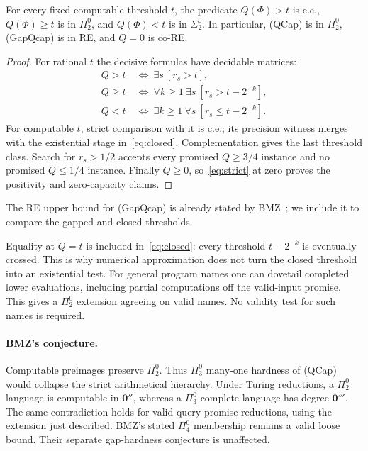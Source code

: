 \begin{corollary}\label{cor:threshold}
For every fixed computable threshold $t$, the predicate $Q(\Phi)>t$ is
c.e., $Q(\Phi)\geq t$ is in $\Pi^0_2$, and $Q(\Phi)<t$ is in
$\Sigma^0_2$. In particular, (QCap) is in $\Pi^0_2$,
(GapQcap) is in RE, and $Q=0$ is co-RE.
\end{corollary}
\begin{proof}
For rational $t$ the decisive formulas have decidable matrices:
\begin{align}
 Q>t&\ \Longleftrightarrow\ \exists s\ [r_s>t],\label{eq:strict}\\
 Q\geq t&\ \Longleftrightarrow\
 \forall k\geq1\ \exists s\ [r_s>t-2^{-k}],\label{eq:closed}\\
 Q<t&\ \Longleftrightarrow\
 \exists k\geq1\ \forall s\ [r_s\leq t-2^{-k}].\label{eq:below}
\end{align}
For computable $t$, strict comparison with it is c.e.; its precision
witness merges with the existential stage in~\eqref{eq:closed}.
Complementation gives the last threshold class. Search for $r_s>1/2$
accepts every promised $Q\geq3/4$ instance and no promised $Q\leq1/4$
instance. Finally $Q\geq0$, so~\eqref{eq:strict} at zero proves the
positivity and zero-capacity claims.
\end{proof}
The RE upper bound for (GapQcap) is already stated by
BMZ~\cite[Section~1.3]{BMZ}; we include it to compare the gapped and
closed thresholds.

Equality at $Q=t$ is included in~\eqref{eq:closed}: every threshold
$t-2^{-k}$ is eventually crossed. This is why numerical approximation
does not turn the closed threshold into an existential test. For general
program names one can dovetail completed lower evaluations, including
partial computations off the valid-input promise. This gives a
$\Pi^0_2$ extension agreeing on valid names. No validity test for such
names is required.

\paragraph{BMZ's conjecture.}
Computable preimages preserve $\Pi^0_2$. Thus $\Pi^0_3$ many-one hardness
of (QCap) would collapse the strict arithmetical hierarchy. Under Turing
reductions, a $\Pi^0_2$ language is computable in $\mathbf0''$, whereas
a $\Pi^0_3$-complete language has degree $\mathbf0'''$. The same
contradiction holds for valid-query promise reductions, using the
extension just described. BMZ's stated $\Pi^0_4$ membership remains a
valid loose bound. Their separate gap-hardness conjecture is unaffected.

